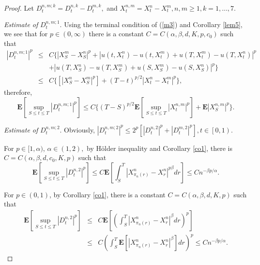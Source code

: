 \documentclass[11pt]{amsart}
\theoremstyle{plain}
\numberwithin{equation}{section}
\begin{document}
\begin{proof}
Let $D_t^{n,m;k}=D_t^{n,k}-D_t^{m,k},$ and $X_t^{n,m}=X_t^{n}-X_t^{m},n,m\geq 1,k=1,\ldots ,7$.

\emph{Estimate of }$D_{t}^{n,m;1}.$ Using the terminal condition of (\ref{m3}) and Corollary \ref{lem5}, we see that for $p\in \left( 0,\infty \right) $
there is a constant $C=C\left( \alpha ,\beta ,d,K,p,c_{0}\right) $ such that 
\begin{eqnarray*}
\left\vert D_{t}^{n,m;1}\right\vert ^{p} &\leq &C\{\left\vert
X_{S}^{m}-X_{S}^{n}\right\vert ^{p}+\left\vert u\left( t,X_{t}^{n}\right)
-u\left( t,X_{t}^{m}\right) +u\left( T,X_{t}^{m}\right) -u\left(
T,X_{t}^{n}\right) \right\vert ^{p} \\
&&+\left\vert u\left( T,X_{S}^{n}\right) -u\left( T,X_{S}^{m}\right)
+u\left( S,X_{S}^{m}\right) -u\left( S,X_{S}^{n}\right) \right\vert ^{p}\} \\
&\leq &C\{\left[ \left\vert X_{S}^{n}-X_{S}^{m}\right\vert ^{p}\right]
+\left( T-t\right) ^{p/2}\left\vert X_{t}^{n}-X_{t}^{m}\right\vert ^{p}\},
\end{eqnarray*}therefore, 
\begin{equation*}
\mathbf{E}\left[ \sup_{S\leq t\leq T}\left\vert D_{t}^{n,m;1}\right\vert ^{p}\right] \leq C\{\left( T-S\right) ^{p/2}\mathbf{E}\left[ \sup_{S\leq t\leq
T}\left\vert X_{t}^{n,m}\right\vert ^{p}\right] +\mathbf{E}\left\vert
X_{S}^{n,m}\right\vert ^{p}\}.
\end{equation*}

\emph{Estimate of }$D_{t}^{n,m;2}$. Obviously, $\left\vert
D_{t}^{n,m;2}\right\vert ^{p}\leq 2^{p}[\left\vert D_{t}^{n,2}\right\vert
^{p}+\left\vert D_{t}^{m,2}\right\vert ^{p}],t\in \left[ 0,1\right) .$

For $p\in \lbrack 1,\alpha )$, $\alpha \in \left( 1,2\right) ,$ by H\"{o}lder inequality and Corollary \ref{co1}, there is $C=C\left( \alpha ,\beta
,d,c_{0},K,p\right) $ such that\begin{equation*}
\mathbf{E}\left[ \sup_{S\leq t\leq T}\left\vert D_{t}^{n,2}\right\vert ^{p}\right] \leq C\mathbf{E}\left[ \int_{S}^{T}\left\vert X_{\pi _{n}\left(
r\right) }^{n}-X_{r}^{n}\right\vert ^{p\beta }dr\right] \leq Cn^{-\beta
p/\alpha }.
\end{equation*}

For $p\in \left( 0,1\right) $, by Corollary \ref{co1}, there is a constant $C=C\left( \alpha ,\beta ,d,K,p\right) $ such that 
\begin{eqnarray*}
\mathbf{E}\left[ \sup_{S\leq t\leq T}\left\vert D_{t}^{n,2}\right\vert ^{p}\right] &\leq &C\mathbf{E}\left[ \left( \int_{S}^{T}\left\vert X_{\pi
_{n}\left( r\right) }^{n}-X_{r}^{n}\right\vert ^{\beta }dr\right) ^{p}\right]
\\
&\leq &C\left( \int_{S}^{T}\mathbf{E}[\left\vert X_{\pi _{n}\left( r\right)
}^{n}-X_{r}^{n}\right\vert ^{\beta }]dr\right) ^{p}\leq Cn^{-\beta p/\alpha
}.
\end{eqnarray*}


\end{proof}
\end{document}
